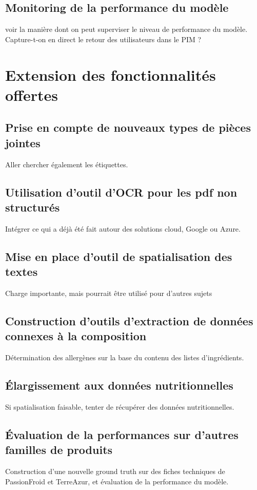         \section{Monitoring de la performance du modèle}
        voir la manière dont on peut superviser le niveau de performance du modèle.
        Capture-t-on en direct le retour des utilisateurs dans le PIM ?

    \chapter{Extension des fonctionnalités offertes}
        \section{Prise en compte de nouveaux types de pièces jointes}
        Aller chercher également les étiquettes.

        \section{Utilisation d'outil d'OCR pour les pdf non structurés}
        Intégrer ce qui a déjà été fait autour des solutions cloud, Google ou Azure.

        \section{Mise en place d'outil de spatialisation des textes}
        Charge importante, mais pourrait être utilisé pour d'autres sujets

        \section{Construction d'outils d'extraction de données connexes à la composition}
        Détermination des allergènes sur la base du contenu des listes d'ingrédients.

        \section{\'{E}largissement aux données nutritionnelles}
        Si spatialisation faisable, tenter de récupérer des données nutritionnelles.

        \section{\'{E}valuation de la performances sur d'autres familles de produits}
        Construction d'une nouvelle ground truth sur des fiches techniques de PassionFroid et TerreAzur, et évaluation de la performance du modèle.
